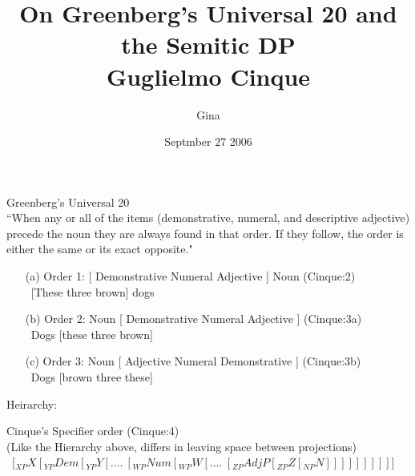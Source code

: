 \documentclass[landscape]{article}
\author{Gina}
\title {On Greenberg's Universal 20 and the Semitic DP\\Guglielmo Cinque}
\date{Septmber 27 2006}
\begin{document}
\maketitle
\begin{example}Greenberg's Universal 20 \label{Greenbergs}\\
``When any or all of the items (demonstrative, numeral, and descriptive adjective) precede the noun they are always found in that order. If they follow, the order is either the same or its exact opposite."\\
\begin{enumerate}
\item [(a)] Order 1: [ Demonstrative Numeral Adjective ] Noun (Cinque:2)\\
~[These three brown] dogs
\item [(b)] Order 2: Noun [ Demonstrative Numeral Adjective ] (Cinque:3a)\\
~Dogs [these three brown]
\item [(c)] Order 3: Noun [ Adjective Numeral Demonstrative ] (Cinque:3b)\\
~Dogs [brown three these]
\end{enumerate}
Heirarchy:\\
\end{example}

\begin{example}Cinque's Specifier order (Cinque:4)\\
(Like the Hierarchy above, differs in leaving space between projections)\\
~[$_{XP} X [_{YP} Dem [_{YP} Y [.\ldots~ [_{WP} Num [_{WP} W [.\ldots~ [_{ZP} AdjP [_{ZP} Z [_{NP} N ] ] ] ] ] ] ] ] ] ]$ \\

\end{example}
\end{document}
